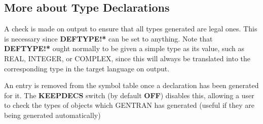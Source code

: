 \subsection{More about Type Declarations}
\label{more:type}
A check is made on output to ensure that all types generated are legal ones.
This is necessary since {\bf DEFTYPE!*} can be set to anything.
Note that {\bf DEFTYPE!*} ought normally to be given a simple
type as its 
value, such as REAL, INTEGER, or COMPLEX,
since this will always be translated into the corresponding type in the
target language on output.

An entry is removed from the symbol table once a declaration has been
generated for it.  The {\bf KEEPDECS} switch (by default {\bf OFF})
disables this, allowing a user to check the types of objects
 which GENTRAN has generated (useful if they
are being generated automatically)

